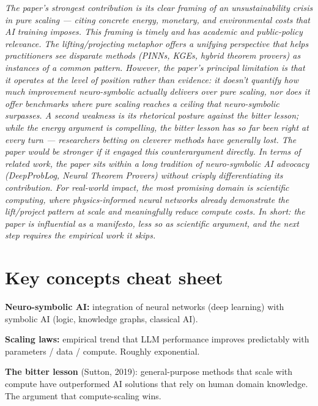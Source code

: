 \documentclass[11pt, a4paper]{article}
\begin{document}
\begin{exambox}
\textit{The paper's strongest contribution is its clear framing of an unsustainability crisis in pure scaling — citing concrete energy, monetary, and environmental costs that AI training imposes. This framing is timely and has academic and public-policy relevance. The lifting/projecting metaphor offers a unifying perspective that helps practitioners see disparate methods (PINNs, KGEs, hybrid theorem provers) as instances of a common pattern. However, the paper's principal limitation is that it operates at the level of position rather than evidence: it doesn't quantify how much improvement neuro-symbolic actually delivers over pure scaling, nor does it offer benchmarks where pure scaling reaches a ceiling that neuro-symbolic surpasses. A second weakness is its rhetorical posture against the bitter lesson; while the energy argument is compelling, the bitter lesson has so far been right at every turn — researchers betting on cleverer methods have generally lost. The paper would be stronger if it engaged this counterargument directly. In terms of related work, the paper sits within a long tradition of neuro-symbolic AI advocacy (DeepProbLog, Neural Theorem Provers) without crisply differentiating its contribution. For real-world impact, the most promising domain is scientific computing, where physics-informed neural networks already demonstrate the lift/project pattern at scale and meaningfully reduce compute costs. In short: the paper is influential as a manifesto, less so as scientific argument, and the next step requires the empirical work it skips.}
\end{exambox}

\section*{Key concepts cheat sheet}

\textbf{Neuro-symbolic AI:} integration of neural networks (deep learning) with symbolic AI (logic, knowledge graphs, classical AI).

\textbf{Scaling laws:} empirical trend that LLM performance improves predictably with parameters / data / compute. Roughly exponential.

\textbf{The bitter lesson} (Sutton, 2019): general-purpose methods that scale with compute have outperformed AI solutions that rely on human domain knowledge. The argument that compute-scaling wins.
\end{document}
